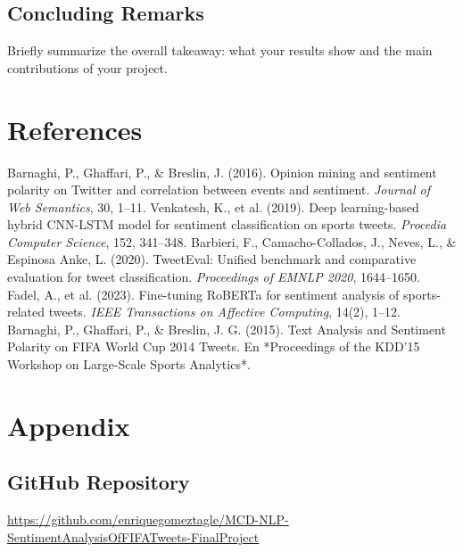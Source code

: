 \documentclass[10pt]{article}
\begin{document}
\subsection{Concluding Remarks}
Briefly summarize the overall takeaway: what your results show and the main contributions of your project.


\section{References}
\begin{thebibliography}{9}
 Barnaghi, P., Ghaffari, P., \& Breslin, J. (2016). Opinion mining and sentiment polarity on Twitter and correlation between events and sentiment. \textit{Journal of Web Semantics}, 30, 1–11.
 Venkatesh, K., et al. (2019). Deep learning-based hybrid CNN-LSTM model for sentiment classification on sports tweets. \textit{Procedia Computer Science}, 152, 341–348.
 Barbieri, F., Camacho-Collados, J., Neves, L., \& Espinosa Anke, L. (2020). TweetEval: Unified benchmark and comparative evaluation for tweet classification. \textit{Proceedings of EMNLP 2020}, 1644–1650.
 Fadel, A., et al. (2023). Fine-tuning RoBERTa for sentiment analysis of sports-related tweets. \textit{IEEE Transactions on Affective Computing}, 14(2), 1–12.
Barnaghi, P., Ghaffari, P., \& Breslin, J. G. (2015). Text Analysis and Sentiment Polarity on FIFA World Cup 2014 Tweets. En *Proceedings of the KDD’15 Workshop on Large-Scale Sports Analytics*.  
\end{thebibliography}
\section{Appendix}
\subsection{GitHub Repository}
\url{https://github.com/enriquegomeztagle/MCD-NLP-SentimentAnalysisOfFIFATweets-FinalProject}
\end{document}
